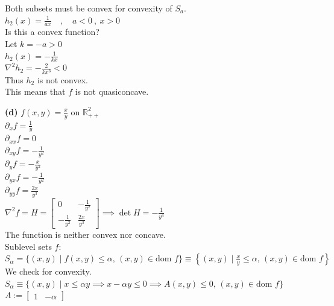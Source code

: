 \documentclass{article}
\begin{document}
\vspace{2.5em}

\noindent Both subsets must be convex for convexity of  $S_a$. \\[1.5em]

\noindent $h_2(x) = \frac{1}{ax} \quad , \quad a < 0 \ , \ x > 0$ \\[1em]

\noindent Is this a convex function? \\
\indent Let $k = -a > 0$ \\
\indent $h_2(x) = -\frac{1}{kx}$ \\[0.5em]
\indent $\nabla^2 h_2 = -\frac{2}{kx^3} < 0$ \\[1em]

\noindent Thus $h_2$ is not convex. \\[0.5em]

\noindent This means that $f$ is not quasiconcave.








\textbf{(d)} \noindent $f(x,y) = \frac{x}{y}$ on $\mathbb{R}_{++}^2$ \\

\noindent $\partial_x f = \frac{1}{y}$ \\
$\partial_{xx} f = 0$ \\
$\partial_{xy} f = -\frac{1}{y^2}$ \\
$\partial_y f = -\frac{x}{y^2}$ \\
$\partial_{yx} f = -\frac{1}{y^2}$ \\
$\partial_{yy} f = \frac{2x}{y^3}$ \\

\noindent $\nabla^2 f = H = \begin{bmatrix} 0 & -\frac{1}{y^2} \\ -\frac{1}{y^2} & \frac{2x}{y^3} \end{bmatrix} \implies \det H = -\frac{1}{y^4}$ \\

\noindent The function is neither convex nor concave. \\

\noindent Sublevel sets $f$: \\
$S_\alpha = \{ (x,y) \mid f(x,y) \leq \alpha, \, (x,y) \in \text{dom } f \} \equiv \left\{ (x,y) \mid \frac{x}{y} \leq \alpha, \, (x,y) \in \text{dom } f \right\}$ \\

\noindent We check for convexity. \\
$S_\alpha \equiv \{ (x,y) \mid x \leq \alpha y \implies x - \alpha y \leq 0 \implies A(x,y) \leq 0, \, (x,y) \in \text{dom } f \}$ \\
$A := \begin{bmatrix} 1 & -\alpha \end{bmatrix}$ \\
\end{document}
